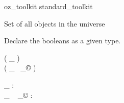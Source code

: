 \begin{zsection}
  \SECTION oz\_toolkit \parents standard\_toolkit
\end{zsection}

Set of all objects in the universe

\begin{zed}
  [\oid]
\end{zed}

Declare the booleans as a given type.

\begin{zed}
  [\bool]
\end{zed}

\begin{zed}
  \function ( \poly \_ )\\
  \function ( \_ ~_{\copyright} )\\
\end{zed}

\begin{gendef}[X]
  \poly \_ : \power \oid \fun \power \oid\\
  \_ ~ _{\copyright} : \power \oid \fun \power \oid
\end{gendef}
